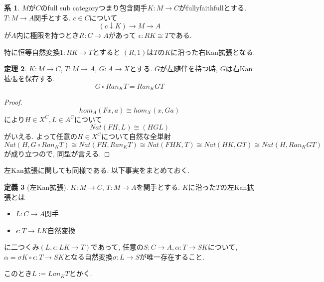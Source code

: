 \documentclass[dvipdfmx,a4paper,11pt]{article}
\theoremstyle{definition}
\newtheorem{thm}{定理}
\newtheorem{cor}[thm]{系}
\newtheorem{dfn}[thm]{定義}
\begin{document}
 \begin{tcolorbox}
 [colback = white, colframe = green!35!black, fonttitle = \bfseries,breakable = true]
\begin{cor}
$M$が$C$のfull sub categoryつまり包含関手$K : M \to C$がfullyfaithfullとする. 
$T : M \to A$関手とする. 
$c \in C$について
$$
(c\downarrow K) \to M \to A
$$
が$A$内に極限を持つとき$R : C \to A$があって
$\epsilon : RK \cong T$である.

特に恒等自然変換$1: RK \to T$とすると
$(R,1)$は$T$の$K$に沿った右Kan拡張となる. 
\end{cor}
\end{tcolorbox}

 \begin{tcolorbox}
 [colback = white, colframe = green!35!black, fonttitle = \bfseries,breakable = true]
\begin{thm}
$K : M \to C$, $T : M \to A$, $G :  A \to X$とする.
$G$が左随伴を持つ時, $G$は右Kan拡張を保存する. 
$$
G \circ Ran_{K} T = Ran_{K}GT
$$
\end{thm}
\end{tcolorbox}

\begin{proof}
$$
hom_{A}(Fx, a) \cong hom_{X}(x,Ga)
$$
により$H \in X^C, L \in A^C$について
$$
Nat(FH, L) \cong (H GL)
$$
がいえる.
よって任意の$H \in X^C$について自然な全単射
$$
Nat(H, G\circ Ran_{K} T )
\cong 
Nat(FH, Ran_{K} T )
\cong 
Nat(FHK, T)
\cong 
Nat(HK, GT)
\cong 
Nat(H, Ran_{K}GT)
$$
が成り立つので, 同型が言える. 
\end{proof}

左Kan拡張に関しても同様である. 
以下事実をまとめておく. 

 \begin{tcolorbox}
 [colback = white, colframe = green!35!black, fonttitle = \bfseries,breakable = true]
\begin{dfn}[左Kan拡張]
$K : M \to C$, $T : M \to A$を関手とする.
$K$に沿った$T$の左Kan拡張とは
\begin{itemize}
\item $L : C \to A$関手
\item $\epsilon :  T \to LK$自然変換
\end{itemize}
に二つくみ$(L, \epsilon : LK \to T)$であって, 
任意の$S : C \to A, \alpha :  T \to SK $について, $\alpha = \sigma K \circ \epsilon:  T \to SK$となる自然変換$\sigma : L \to S$が唯一存在すること. 

このとき$L := Lan_{K}T$とかく. 
\end{dfn}
\end{tcolorbox}
\end{document}
